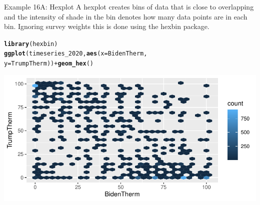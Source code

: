 \documentclass{beamer}\usepackage[]{graphicx}\usepackage[]{color}
\makeatletter
\newcommand{\hlopt}[1]{\textcolor[rgb]{0,0,0}{#1}}%
\newcommand{\hlstd}[1]{\textcolor[rgb]{0.345,0.345,0.345}{#1}}%
\newcommand{\hlkwc}[1]{\textcolor[rgb]{0.333,0.667,0.333}{#1}}%
\newcommand{\hlkwd}[1]{\textcolor[rgb]{0.737,0.353,0.396}{\textbf{#1}}}%
\newenvironment{kframe}{%
 \def\at@end@of@kframe{}%
 \ifinner\ifhmode%
  \def\at@end@of@kframe{\end{minipage}}%
  \begin{minipage}{\columnwidth}%
 \fi\fi%
 \def\FrameCommand##1{\hskip\@totalleftmargin \hskip-\fboxsep
 \colorbox{shadecolor}{##1}\hskip-\fboxsep
     \hskip-\linewidth \hskip-\@totalleftmargin \hskip\columnwidth}%
 \MakeFramed {\advance\hsize-\width
   \@totalleftmargin\z@ \linewidth\hsize
   \@setminipage}}%
 {\par\unskip\endMakeFramed%
 \at@end@of@kframe}
\newenvironment{knitrout}{}{} %
\makeatother
\begin{document}
\begin{frame}[fragile]{Example 16A: Hexplot}
A hexplot creates bins of data that is close to overlapping and the intensity of shade in the bin denotes how many data points are in each bin. Ignoring survey weights this is done using the hexbin package.
\begin{knitrout}
\color{fgcolor}\begin{kframe}
\begin{alltt}
\hlkwd{library}\hlstd{(hexbin)}
\hlkwd{ggplot}\hlstd{(timeseries_2020,} \hlkwd{aes}\hlstd{(}\hlkwc{x} \hlstd{= BidenTherm,}
    \hlkwc{y} \hlstd{= TrumpTherm))} \hlopt{+} \hlkwd{geom_hex}\hlstd{()}
\end{alltt}
\end{kframe}
\includegraphics[width=0.95\linewidth]{figure/unnamed-chunk-62-1} 
\end{knitrout}


\end{frame}
\end{document}
